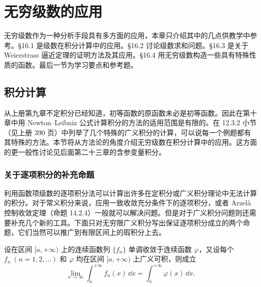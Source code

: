 \chapter{无穷级数的应用}

无穷级数作为一种分析手段具有多方面的应用，本章只介绍其中的几点供教学中参考。§16.1 是级数在积分计算中的应用。§16.2 讨论级数求和问题。§16.3 是关于 Weierstrass 逼近定理的证明方法及其应用。§16.4 用无穷级数构造一些具有特殊性质的函数。最后一节为学习要点和参考题。

\section{积分计算}

从上册第九章不定积分已经知道，初等函数的原函数未必是初等函数。因此在第十章中用 Newton--Leibniz 公式计算积分的方法的适用范围是有限的。在 12.3.2 小节（见上册 390 页）中列举了几个特殊的广义积分的计算，可以说每一个例题都有其特殊的方法。本节将从方法论的角度介绍无穷级数在积分计算中的应用。这方面的更一般性讨论见后面第二十三章的含参变量积分。

\subsection{关于逐项积分的补充命题}

利用函数项级数的逐项积分法可以计算出许多在定积分或广义积分理论中无法计算的积分。对于常义积分来说，应用一致收敛充分条件下的逐项积分，或者 Arzelà 控制收敛定理（命题 14.2.4）一般就可以解决问题。但是对于广义积分问题则还需要补充几个新的工具。下面只对无穷限广义积分写出保证逐项积分成立的两个命题，它们当然可以推广到有限区间上的瑕积分上去。

\begin{xproposition}[16.1.1]
设在区间 $[a,+\infty)$ 上的连续函数列 $\{f_n\}$ 单调收敛于连续函数 $\varphi$，又设每个 $f_n\ (n=1,2,\ldots)$ 和 $\varphi$ 均在区间 $[a,+\infty)$ 上广义可积，则成立
\[
  \lim_{n\to\infty}\int_a^{+\infty}f_n(x)\,\dd x
  =\int_a^{+\infty}\varphi(x)\,\dd x.
\]
\end{xproposition}


